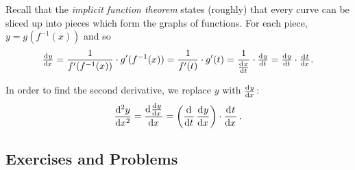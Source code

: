 Recall that the \emph{implicit function theorem} states (roughly) that every curve can be sliced up into pieces which form the graphs of functions. For
each piece, $ y = g(f^{-1}(x)) $ and so
\begin{displaymath}
  \od{y}{x} = \frac{1}{f'(f^{-1}(x))} \cdot g'(f^{-1}(x)) = \frac{1}{f'(t)} \cdot g'(t) = \frac{1}{\od{x}{t}} \cdot \od{y}{t} = \od{y}{t} \cdot \od{t}{x}.
\end{displaymath}

In order to find the second derivative, we replace $ y $ with $ \od{y}{x} $:
\begin{displaymath}
  \dod[2]{y}{x} = \dod{\od{y}{x}}{x} = \left(\dod{}{t} \dod{y}{x}\right) \cdot \dod{t}{x}.
\end{displaymath}

\subsection{Exercises and Problems}
